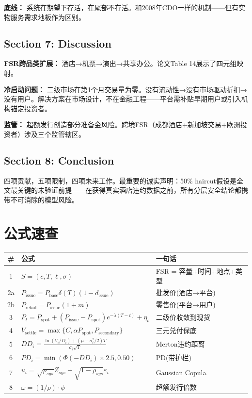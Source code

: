 \documentclass[12pt,a4paper]{ctexart}
\begin{document}
\textbf{底线：} 系统在期望下存活，在尾部不存活。和2008年CDO一样的机制——但有实物服务需求地板作为区别。

\subsection{Section 7: Discussion}

\textbf{FSR跨品类扩展：} 酒店→机票→演出→共享办公。论文Table 14展示了四元组映射。

\textbf{冷启动问题：} 二级市场在第1个月交易量为零。没有流动性→没有市场驱动折扣→没有用户。解决方案在市场设计，不在金融工程——平台需补贴早期用户或引入机构锚定投资者。

\textbf{监管：} 超额发行创造部分准备金风险。跨境FSR（成都酒店+新加坡交易+欧洲投资者）涉及三个监管辖区。

\subsection{Section 8: Conclusion}

四项贡献，五项限制，四项未来工作。最重要的诚实声明：50\% haircut假设是全文最关键的未验证前提——在获得真实酒店违约数据之前，所有分层安全结论都携带不可消除的模型风险。

\newpage

\section{公式速查}

\begin{center}
\begin{tabular}{@{}cll@{}}
\toprule
\# & 公式 & 一句话 \\
\midrule
1  & $S=(c,T,\ell,\sigma)$ & FSR = 容量+时间+地点+类型 \\
2a & $P_{\text{issue}}=P_{\text{base}}\delta(T)(1-d_{\text{issue}})$ & 批发价(酒店→平台) \\
2b & $P_{\text{retail}}=P_{\text{issue}}(1+m)$ & 零售价(平台→用户) \\
3  & $P_t=P_{\text{spot}}+(P_{\text{issue}}-P_{\text{spot}})e^{-\lambda(T-t)}+\eta_t$ & 二级价收敛到现货 \\
4  & $V_{\text{settle}}=\max\{C,\alpha P_{\text{spot}},P_{\text{secondary}}\}$ & 三元兑付保底 \\
5  & $DD_i=\frac{\ln(V_i/D_i)+(\mu-\sigma_i^2/2)T}{\sigma_i\sqrt{T}}$ & Merton违约距离 \\
6  & $PD_i=\min(\Phi(-DD_i)\times2.5,0.50)$ & PD(带护栏) \\
7  & $u_i=\sqrt{\rho_{sys}}Z_{sys}+\sqrt{1-\rho_{sys}}\varepsilon_i$ & Gaussian Copula \\
8  & $\omega=(1/\rho)\cdot\phi$ & 超额发行倍数 \\
\bottomrule
\end{tabular}
\end{center}
\end{document}
